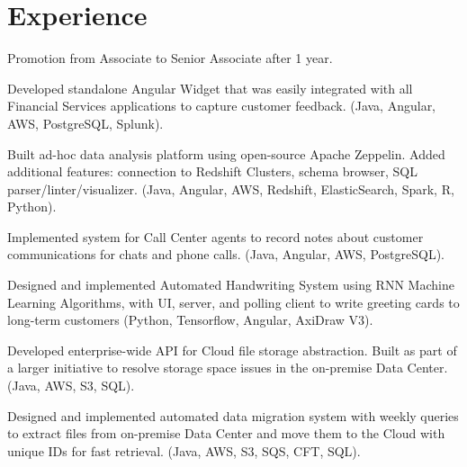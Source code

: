 \documentclass[letterpaper]{deedy-resume} %
\begin{document}
\hfill
%
%
\begin{minipage}[t]{0.7\textwidth} %


\section{Experience}


\vspace{\topsep} %
\begin{tightitemize}
\item Promotion from Associate to Senior Associate after 1 year.
\item Developed standalone Angular Widget that was easily integrated with all Financial Services applications to capture customer feedback. (Java, Angular, AWS, PostgreSQL, Splunk).
\item Built ad-hoc data analysis platform using open-source Apache Zeppelin. Added additional features: connection to Redshift Clusters, schema browser, SQL parser/linter/visualizer. (Java, Angular, AWS, Redshift, ElasticSearch, Spark, R, Python).
\item Implemented system for Call Center agents to record notes about customer communications for chats and phone calls. (Java, Angular, AWS, PostgreSQL).
\item Designed and implemented Automated Handwriting System using RNN Machine Learning Algorithms, with UI, server, and polling client to write greeting cards to long-term customers (Python, Tensorflow, Angular, AxiDraw V3).
\item Developed enterprise-wide API for Cloud file storage abstraction. Built as part of a larger initiative to resolve storage space issues in the on-premise Data Center. (Java, AWS, S3, SQL).
\item Designed and implemented automated data migration system with weekly queries to extract files from on-premise Data Center and move them to the Cloud with unique IDs for fast retrieval. (Java, AWS, S3, SQS, CFT, SQL). 
\end{tightitemize}


\end{minipage}
\end{document}

